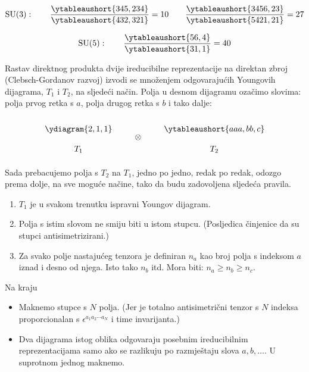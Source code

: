 \begin{displaymath}
\SU{3}: \qquad \frac{\ytableaushort{345,234}}{\ytableaushort{432,321}} = 10
 \qquad 
\frac{\ytableaushort{3456,23}}{\ytableaushort{5421,21}} = 27
\end{displaymath}

\begin{displaymath}
\SU{5}: \qquad \frac{\ytableaushort{56,4}}{\ytableaushort{31,1}} = 40
\end{displaymath}


Rastav direktnog produkta dvije  ireducibilne reprezentacije na direktan zbroj
(Clebsch-Gordanov razvoj) izvodi se množenjem odgovarajućih
Youngovih dijagrama, $T_1$ i $T_2$, na sljedeći način. Polja u desnom
dijagramu ozačimo slovima: polja prvog retka
s $a$, polja drugog retka s $b$ i tako dalje:

\begin{displaymath}
\renewcommand{\arraystretch}{2}
\begin{array}{c}
\ydiagram{2,1,1} \\ T_1
\end{array}
 \qquad \otimes \qquad 
\begin{array}{c}
\ytableaushort{aaa,bb,c} \\ T_2
\end{array}
\end{displaymath}

Sada prebacujemo polja s $T_2$ na $T_1$, jedno po jedno, redak
po redak, odozgo prema dolje, na sve moguće načine, tako da
budu zadovoljena sljedeća pravila.
\begin{enumerate}[itemsep=2pt, topsep=1ex]
\item $T_1$ je u svakom trenutku ispravni Youngov dijagram.
\item Polja s istim slovom ne smiju biti u istom stupcu.
 (Posljedica činjenice da su stupci antisimetrizirani.)
\item Za svako polje nastajućeg tenzora je definiran $n_a$
kao broj polja s indeksom $a$ iznad i desno od njega.
Isto tako $n_b$ itd. Mora biti: $n_a \ge n_b \ge n_c$.
\end{enumerate}

Na kraju 
\begin{itemize}
\item Maknemo stupce s $N$ polja. (Jer je totalno
antisimetrični tenzor s $N$ indeksa proporcionalan
s $\epsilon^{a_1 a_2 \cdots a_N}$ i time 
invarijanta.)
\item Dva dijagrama istog oblika  odgovaraju
posebnim ireducibilnim reprezentacijama samo ako se razlikuju po razmještaju
slova $a,b,\dots$. U suprotnom jednog maknemo.
\end{itemize}


